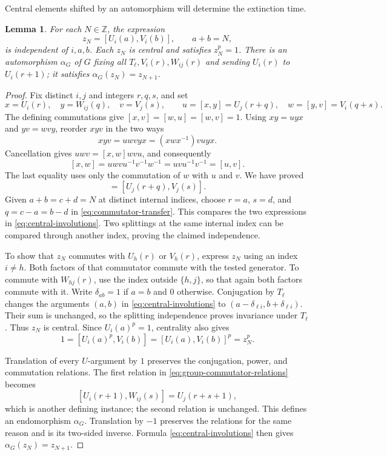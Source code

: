 \documentclass[11pt]{article}
\numberwithin{equation}{section}
\newtheorem{lemma}[theorem]{Lemma}
\theoremstyle{definition}
\theoremstyle{remark}
\newcommand{\Z}{\mathbb Z}
\begin{document}
Central elements shifted by an automorphism will determine the
extinction time.

\begin{lemma}
\label{lem:central-shift}
For each $N\in\Z$, the expression
\begin{equation}
  z_N=[U_i(a),V_i(b)],\qquad a+b=N,
  \label{eq:central-involutions}
\end{equation}
is independent of $i,a,b$.  Each $z_N$ is central and satisfies
$z_N^p=1$.  There is an automorphism $\alpha_G$ of $G$ fixing all
$T_\ell,V_i(r),W_{ij}(r)$ and sending $U_i(r)$ to $U_i(r+1)$;
it satisfies $\alpha_G(z_N)=z_{N+1}$.
\end{lemma}

\begin{proof}
Fix distinct $i,j$ and integers $r,q,s$, and set
\[
 x=U_i(r),\quad y=W_{ij}(q),\quad v=V_j(s),\qquad
 u=[x,y]=U_j(r+q),\quad w=[y,v]=V_i(q+s).
\]
The defining commutations give $[x,v]=[w,u]=[w,v]=1$.
Using $xy=uyx$ and $yv=wvy$, reorder $xyv$ in the two ways
\[
  xyv=uwvyx=(xwx^{-1})vuyx.
\]
Cancellation gives $uwv=[x,w]wvu$, and consequently
\[
  [x,w]=uwvu^{-1}v^{-1}w^{-1}=uvu^{-1}v^{-1}=[u,v].
\]
The last equality uses only the commutation of $w$ with $u$ and $v$.
We have proved
\begin{equation}
 [U_i(r),V_i(q+s)]=[U_j(r+q),V_j(s)].
 \label{eq:commutator-transfer}
\end{equation}
Given $a+b=c+d=N$ at distinct internal indices, choose
$r=a$, $s=d$, and $q=c-a=b-d$ in
\eqref{eq:commutator-transfer}.  This compares the two expressions
in \eqref{eq:central-involutions}.  Two splittings at the same
internal index can be compared through another index, proving
the claimed independence.

To show that $z_N$ commutes with $U_h(r)$ or $V_h(r)$, express
$z_N$ using an index $i\neq h$.  Both factors of that commutator
commute with the tested generator.  To commute with $W_{hj}(r)$,
use the index outside $\{h,j\}$, so that again both factors commute
with it. Write $\delta_{ab}=1$ if $a=b$ and $0$ otherwise.
Conjugation by $T_\ell$ changes the arguments
$(a,b)$ in \eqref{eq:central-involutions} to
$(a-\delta_{\ell i},b+\delta_{\ell i})$.  Their sum is unchanged,
so the splitting independence proves invariance under $T_\ell$.
Thus $z_N$ is central.  Since $U_i(a)^p=1$, centrality also gives
\[
  1=[U_i(a)^p,V_i(b)]=[U_i(a),V_i(b)]^p=z_N^p.
\]

Translation of every $U$-argument by $1$ preserves the conjugation,
power, and commutation relations.  The first relation in
\eqref{eq:group-commutator-relations} becomes
\[
  [U_i(r+1),W_{ij}(s)]=U_j(r+s+1),
\]
which is another defining instance; the second relation is unchanged.
This defines an endomorphism $\alpha_G$.  Translation by $-1$
preserves the relations for the same reason and is its two-sided
inverse.  Formula \eqref{eq:central-involutions} then gives
$\alpha_G(z_N)=z_{N+1}$.
\end{proof}
\end{document}
